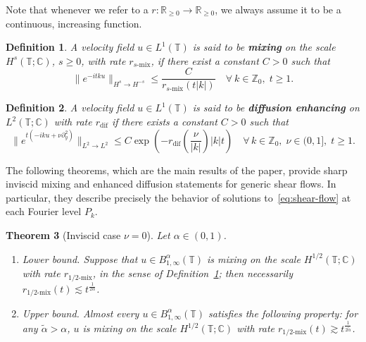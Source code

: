 \documentclass[11pt,oneside,reqno]{amsart}
\newcommand{\tmdfn}[1]{\textbf{#1}}
\newcommand{\tmtextit}[1]{\text{{\itshape{#1}}}}
\newenvironment{enumeratealpha}{\begin{enumerate}[a{\textup{)}}] }{\end{enumerate}}
\newtheorem{theorem}{Theorem}[section]
\newtheorem{definition}[theorem]{Definition}
\numberwithin{equation}{section}
\begin{document}
Note that whenever we refer to a \tmtextit{rate} $r : \mathbb{R}_{\geqslant
0} \rightarrow \mathbb{R}_{\geqslant 0}$, we always assume it to be a
continuous, increasing function.

\begin{definition}
  \label{def:mixing}A velocity field $u \in L^1 (\mathbb{T})$ is said to be
  {\tmdfn{mixing}} on the scale $H^s (\mathbb{T}; \mathbb{C})$, $s \geqslant
  0$, with rate $r_{s \text{-mix}}$, if there exist a constant
  $C > 0$ such that
  \begin{equation}
    \| e^{- i t k u} \|_{H^s \rightarrow H^{- s}} \leqslant
    \frac{C}{r_{s \text{-mix}} (t | k |)}  \quad \forall \: k
    \in \mathbb{Z}_0, \; t \geqslant 1. \label{eq:def-mixing}
  \end{equation}
\end{definition}

\begin{definition}
  \label{def:diffusion-enhancing}A velocity field $u \in L^1 (\mathbb{T})$ is
  said to be {\tmdfn{diffusion enhancing}} on $L^2 (\mathbb{T}; \mathbb{C})$
  with rate $r_{\text{dif}}$ if there exists a constant $C > 0$
  such that
  \begin{equation}
    \| e^{t (- i k u + \nu \partial_y^2)} \|_{L^2 \rightarrow L^2} \leqslant C
    \exp \left( - r_{\text{dif}} \left( \frac{\nu}{| k |}
    \right) | k | t \right)  \quad \forall \, k \in \mathbb{Z}_0, \; \nu \in
    (0, 1], \; t \geqslant 1. \label{eq:def-enhancing}
  \end{equation}
\end{definition}

The following theorems, which are the main results of the paper, provide sharp
inviscid mixing and enhanced diffusion statements for generic shear flows. In
particular, they describe precisely the behavior of solutions
to~\eqref{eq:shear-flow} at each Fourier level $P_k$.

\begin{theorem}[Inviscid case $\nu = 0$]
  \label{thm:main-thm-inviscid}Let $\alpha \in (0, 1)$.
  \begin{enumeratealpha}
    \item Lower bound. Suppose that $u \in B^{\alpha}_{1, \infty}
    (\mathbb{T})$ is mixing on the scale $H^{1 / 2} (\mathbb{T}; \mathbb{C})$
    with rate $r_{1 / 2 \text{-mix}}$, in the sense of
    Definition~\ref{def:mixing}; then necessarily $r_{1 / 2
    \text{-mix}} (t) \lesssim t^{\frac{1}{2 \alpha}}$.
    
    \item Upper bound. Almost every $u \in B^{\alpha}_{1, \infty}
    (\mathbb{T})$ satisfies the following property: for any $\tilde{\alpha} >
    \alpha$, $u$ is mixing on the scale $H^{1 / 2} (\mathbb{T}; \mathbb{C})$
    with rate $r_{1 / 2 \text{-mix}} (t) \gtrsim t^{\frac{1}{2
    \tilde{\alpha}}}$.
  \end{enumeratealpha}
\end{theorem}
\end{document}
